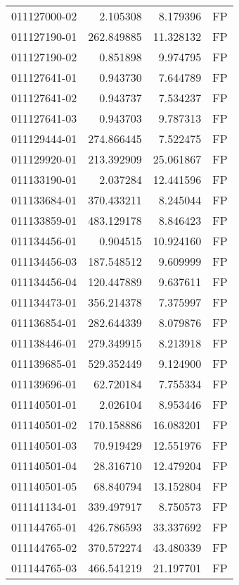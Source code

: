 \begin{tabular}{lrrl}
011127000-02 &    2.105308 &       8.179396 &   FP \\
011127190-01 &  262.849885 &      11.328132 &   FP \\
011127190-02 &    0.851898 &       9.974795 &   FP \\
011127641-01 &    0.943730 &       7.644789 &   FP \\
011127641-02 &    0.943737 &       7.534237 &   FP \\
011127641-03 &    0.943703 &       9.787313 &   FP \\
011129444-01 &  274.866445 &       7.522475 &   FP \\
011129920-01 &  213.392909 &      25.061867 &   FP \\
011133190-01 &    2.037284 &      12.441596 &   FP \\
011133684-01 &  370.433211 &       8.245044 &   FP \\
011133859-01 &  483.129178 &       8.846423 &   FP \\
011134456-01 &    0.904515 &      10.924160 &   FP \\
011134456-03 &  187.548512 &       9.609999 &   FP \\
011134456-04 &  120.447889 &       9.637611 &   FP \\
011134473-01 &  356.214378 &       7.375997 &   FP \\
011136854-01 &  282.644339 &       8.079876 &   FP \\
011138446-01 &  279.349915 &       8.213918 &   FP \\
011139685-01 &  529.352449 &       9.124900 &   FP \\
011139696-01 &   62.720184 &       7.755334 &   FP \\
011140501-01 &    2.026104 &       8.953446 &   FP \\
011140501-02 &  170.158886 &      16.083201 &   FP \\
011140501-03 &   70.919429 &      12.551976 &   FP \\
011140501-04 &   28.316710 &      12.479204 &   FP \\
011140501-05 &   68.840794 &      13.152804 &   FP \\
011141134-01 &  339.497917 &       8.750573 &   FP \\
011144765-01 &  426.786593 &      33.337692 &   FP \\
011144765-02 &  370.572274 &      43.480339 &   FP \\
011144765-03 &  466.541219 &      21.197701 &   FP \\

\end{tabular}
